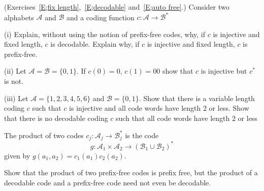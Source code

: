 \begin{question}\label{C1.2} 
(Exercises~\ref{E;fix length},~\ref{E;decodable}
and~\ref{E;auto free}.)
Consider two alphabets ${\mathcal A}$
and ${\mathcal B}$
and a coding function $c:{\mathcal A}\rightarrow{\mathcal B}^{*}$

(i) Explain, without using the notion of prefix-free
codes, why, if $c$ is injective
and fixed length, $c$
is  decodable. Explain why, if $c$ is injective
and fixed length, $c$
is  prefix-free.

(ii) Let ${\mathcal A}={\mathcal B}=\{0,1\}$. If
$c(0)=0$, $c(1)=00$ show that $c$ is injective but $c^{*}$ is not.

(iii) Let ${\mathcal A}=\{1,2,3,4,5,6\}$ and ${\mathcal B}=\{0,1\}$.
Show that there is a variable length coding $c$ such that
$c$ is injective and all code words have length $2$ or less.
Show that there is no decodable coding $c$ such that
all code words have length $2$ or less
\end{question}
\begin{question}\label{C1.3} The product of two codes 
$c_{j}:{\mathcal A}_{j}\rightarrow{\mathcal B}^{*}_{j}$
is the code 
\[g:{\mathcal A}_{1}\times{\mathcal A}_{2}
\rightarrow({\mathcal B}_{1}\cup{\mathcal B}_{2})^{*}\]
given by
$g(a_{1},a_{2})=c_{1}(a_{1})c_{2}(a_{2})$. 

Show that the product of two prefix-free codes is prefix
free, but the product of a decodable code and a prefix-free
code need not even be decodable.
\end{question} 

